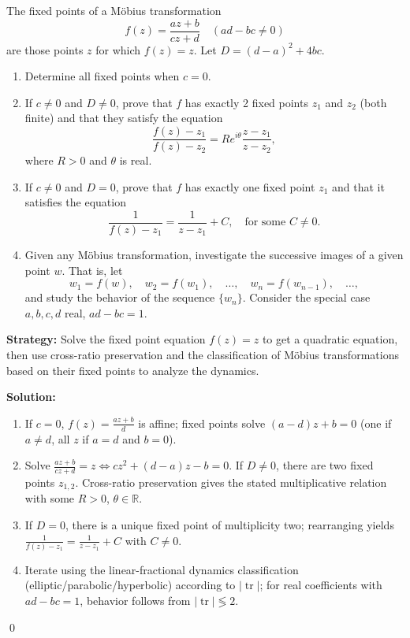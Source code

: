 \begin{problembox}
\begin{problemstatement}
The fixed points of a Möbius transformation
\[ f(z) = \frac{a z + b}{c z + d} \quad (ad - bc \neq 0) \]
are those points \( z \) for which \( f(z) = z \). Let \( D = (d - a)^2 + 4bc \).
\begin{enumerate}[label=(\alph*)]
\item Determine all fixed points when \( c = 0 \).
\item If \( c \neq 0 \) and \( D \neq 0 \), prove that \( f \) has exactly 2 fixed points \( z_1 \) and \( z_2 \) (both finite) and that they satisfy the equation
\[ \frac{f(z) - z_1}{f(z) - z_2} = R e^{i \theta} \frac{z - z_1}{z - z_2}, \]
where \( R > 0 \) and \( \theta \) is real.
\item If \( c \neq 0 \) and \( D = 0 \), prove that \( f \) has exactly one fixed point \( z_1 \) and that it satisfies the equation
\[ \frac{1}{f(z) - z_1} = \frac{1}{z - z_1} + C, \quad \text{for some } C \neq 0. \]
\item Given any Möbius transformation, investigate the successive images of a given point \( w \). That is, let
\[ w_1 = f(w), \quad w_2 = f(w_1), \quad \ldots, \quad w_n = f(w_{n-1}), \quad \ldots, \]
and study the behavior of the sequence \( \{ w_n \} \). Consider the special case \( a, b, c, d \) real, \( ad - bc = 1 \).
\end{enumerate}
\end{problemstatement}
\end{problembox}

\noindent\textbf{Strategy:} Solve the fixed point equation \( f(z) = z \) to get a quadratic equation, then use cross-ratio preservation and the classification of Möbius transformations based on their fixed points to analyze the dynamics.

\bigskip\noindent\textbf{Solution:}
\begin{enumerate}[label=(\alph*)]
\item If $c=0$, $f(z)=\frac{a z+b}{d}$ is affine; fixed points solve $(a-d)z+b=0$ (one if $a\ne d$, all $z$ if $a=d$ and $b=0$).
\item Solve $\frac{a z+b}{c z+d}=z\iff c z^2+(d-a)z-b=0$. If $D\ne0$, there are two fixed points $z_{1,2}$. Cross-ratio preservation gives the stated multiplicative relation with some $R>0$, $\theta\in\mathbb R$.
\item If $D=0$, there is a unique fixed point of multiplicity two; rearranging yields $\frac{1}{f(z)-z_1}=\frac{1}{z-z_1}+C$ with $C\ne0$.
\item Iterate using the linear-fractional dynamics classification (elliptic/parabolic/hyperbolic) according to $|\operatorname{tr}|$; for real coefficients with $ad-bc=1$, behavior follows from $|\operatorname{tr}|\lessgtr2$.
\end{enumerate}\qed
